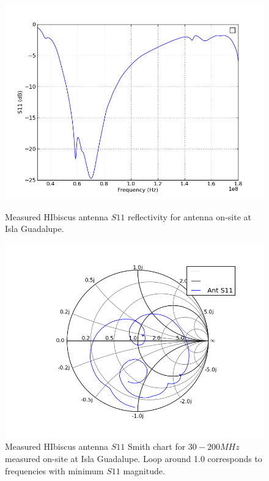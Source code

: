 \begin{figure}[htb]
\centering
\begin{minipage}[b]{0.53\textwidth}
\centering
\includegraphics[width=0.95\linewidth]{SCIHI_system/figures/HIbiscus_S11_dB_70MHz.png}
\caption{Measured HIbiscus antenna $S11$ reflectivity for antenna on-site at Isla Guadalupe. }
\label{Fig:HIS11_dB_70}
\end{minipage}%
\begin{minipage}[b]{0.02\textwidth}
\hspace{1cm}
\end{minipage}%
\begin{minipage}[b]{0.44\textwidth}
\centering
\includegraphics[width=0.95\linewidth]{SCIHI_system/figures/HIbiscus_S11_meas_smith.png}
\caption{Measured HIbiscus antenna $S11$ Smith chart for $30-200 MHz$ measured on-site at Isla Guadalupe. Loop around 1.0 corresponds to frequencies with minimum $S11$ magnitude.}
\label{Fig:HIS11_Smith_70}
\end{minipage}
\end{figure}

